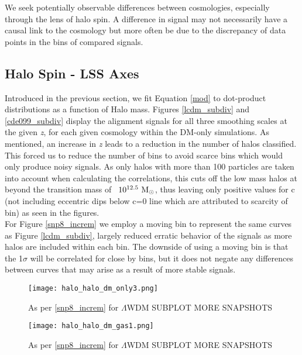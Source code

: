 \documentclass[a4paper,fleqn,usenatbib]{mnras}
\def \Msun{\ {\rm M_\odot}}
\def \lwdm{$\Lambda$WDM }
\begin{document}
We seek potentially observable differences between cosmologies, especially through the lens of halo spin. A difference in signal may not necessarily have a causal link to the cosmology but more often be due to the discrepancy of data points in the bins of compared signals. 

\subsection{Halo Spin - LSS Axes}\label{halolss}
Introduced in the previous section, we fit Equation \ref{mod} to dot-product distributions as a function of Halo mass. Figures \ref{lcdm_subdiv} and \ref{cde099_subdiv} display the alignment signals for all three smoothing scales at the given \textit{z}, for each given cosmology within the DM-only simulations. As mentioned, an increase in \textit{z} leads to a reduction in the number of halos classified. This forced us to reduce the number of bins to avoid scarce bins which would only produce noisy signals. As only halos with more than 100 particles are taken into account when calculating the correlations, this cuts off the low mass halos at beyond the transition mass of ~$10^{12.5}\Msun$, thus leaving only positive values for c (not including eccentric dips below c=0 line which are attributed to scarcity of bin) as seen in the figures. 
\\
For Figure \ref{snp8_increm} we employ a moving bin to represent the same curves as Figure \ref{lcdm_subdiv}, largely reduced erratic behavior of the signals as more halos are included within each bin. The downside of using a moving bin is that the 1$\sigma$ will be correlated for close by bins, but it does not negate any differences between curves that may arise as a result of more stable signals. 

\begin{figure}
\centering
\texttt{[image: halo\_halo\_dm\_only3.png]} 
\caption{As per \ref{snp8_increm} for \lwdm{} SUBPLOT MORE SNAPSHOTS }\label{hhdm}
\end{figure}
\begin{figure}
\centering
\texttt{[image: halo\_halo\_dm\_gas1.png]} 
\caption{As per \ref{snp8_increm} for \lwdm{} SUBPLOT MORE SNAPSHOTS }\label{hhdmg}
\end{figure}
\end{document}
